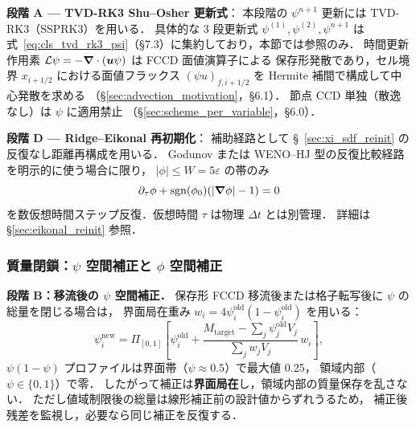 \noindent\textbf{段階 A — TVD-RK3 Shu--Osher 更新式}：
本段階の $\psi^{n+1}$ 更新には TVD-RK3（SSPRK3）を用いる．
具体的な 3 段更新式 $\psi^{(1)},\psi^{(2)},\psi^{n+1}$ は
式~\eqref{eq:cls_tvd_rk3_psi}（§7.3）に集約しており，本節では参照のみ．
時間更新作用素 $\mathcal{L}\psi = -\bm{\nabla}\cdot(\bm{u}\psi)$ は FCCD 面値演算子による
保存形発散であり，セル境界 $x_{i+1/2}$ における面値フラックス
$(\psi u)_{f,i+1/2}$ を Hermite 補間で構成して中心発散を求める
（\S\ref{sec:advection_motivation}，§6.1）．
節点 CCD 単独（散逸なし）は $\psi$ に適用禁止
（\S\ref{sec:scheme_per_variable}，§6.0）．
\label{eq:cls_rk3_1}%
\label{eq:cls_rk3_2}%
\label{eq:cls_rk3_3}%

\noindent\textbf{段階 D — Ridge--Eikonal 再初期化}：
補助経路として §~\ref{sec:xi_sdf_reinit} の反復なし距離再構成を用いる．
Godunov または WENO--HJ 型の反復比較経路を明示的に使う場合に限り，
$|\phi|\le W=5\varepsilon$ の帯のみ
\begin{equation*}
  \partial_\tau\phi + \mathrm{sgn}(\phi_0)(|\bm{\nabla}\phi|-1) = 0
\end{equation*}
を数仮想時間ステップ反復．仮想時間 $\tau$ は物理 $\Delta t$ とは別管理．
詳細は \S\ref{sec:eikonal_reinit} 参照．

\subsubsection{\texorpdfstring{質量閉鎖：$\psi$ 空間補正と $\phi$ 空間補正}{質量閉鎖：ψ空間補正とφ空間補正}}
\label{sec:cls_mass_correction}

\noindent\textbf{段階 B：移流後の $\psi$ 空間補正．}
保存形 FCCD 移流後または格子転写後に $\psi$ の総量を閉じる場合は，
界面局在重み $w_i=4\psi_i^{\text{old}}(1-\psi_i^{\text{old}})$ を用いる：
\begin{equation}
  \psi_i^{\text{new}}
  = \Pi_{[0,1]}\!\left[
      \psi_i^{\text{old}}
      + \frac{M_\text{target}-\sum_j\psi_j^{\text{old}}V_j}
             {\sum_j w_j V_j}\,w_i
    \right],
  \label{eq:cls_mass_correction}
\end{equation}
$\psi(1-\psi)$ プロファイルは界面帯（$\psi\approx 0.5$）で最大値 0.25，
領域内部（$\psi\in\{0,1\}$）で零．
したがって補正は\textbf{界面局在}し，領域内部の質量保存を乱さない．
ただし値域制限後の総量は線形補正前の設計値からずれうるため，
補正後残差を監視し，必要なら同じ補正を反復する．

